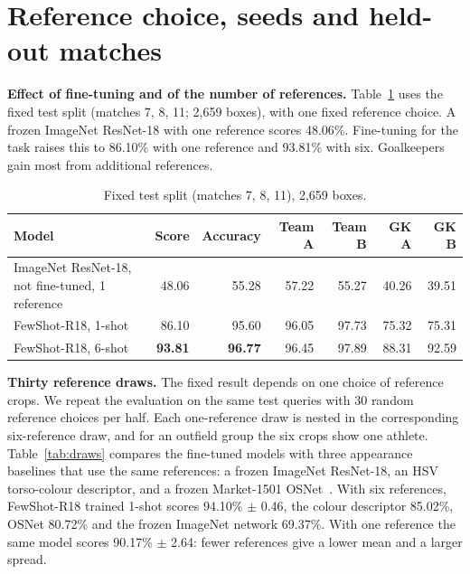\documentclass[10pt]{article}
\begin{document}
\section{Reference choice, seeds and held-out matches}
\label{sec:variance}

\textbf{Effect of fine-tuning and of the number of references.} Table~\ref{tab:fixed} uses the fixed test split (matches 7, 8, 11; 2,659 boxes), with one fixed reference choice. A frozen ImageNet ResNet-18 with one reference scores 48.06\%. Fine-tuning for the task raises this to 86.10\% with one reference and 93.81\% with six. Goalkeepers gain most from additional references.

\begin{table}[tbp]
\centering
\caption{Fixed test split (matches 7, 8, 11), 2,659 boxes.}
\label{tab:fixed}
\small
\begin{tabular}{lrrrrrr}
\toprule
Model & Score & Accuracy & Team A & Team B & GK A & GK B \\
\midrule
ImageNet ResNet-18, not fine-tuned, 1 reference & 48.06 & 55.28 & 57.22 & 55.27 & 40.26 & 39.51 \\
FewShot-R18, 1-shot & 86.10 & 95.60 & 96.05 & 97.73 & 75.32 & 75.31 \\
FewShot-R18, 6-shot & \textbf{93.81} & \textbf{96.77} & 96.45 & 97.89 & 88.31 & 92.59 \\
\bottomrule
\end{tabular}
\end{table}

\textbf{Thirty reference draws.} The fixed result depends on one choice of reference crops. We repeat the evaluation on the same test queries with 30 random reference choices per half. Each one-reference draw is nested in the corresponding six-reference draw, and for an outfield group the six crops show one athlete. Table~\ref{tab:draws} compares the fine-tuned models with three appearance baselines that use the same references: a frozen ImageNet ResNet-18, an HSV torso-colour descriptor, and a frozen Market-1501 OSNet~\cite{zhou2019osnet}. With six references, FewShot-R18 trained 1-shot scores 94.10\% $\pm$ 0.46, the colour descriptor 85.02\%, OSNet 80.72\% and the frozen ImageNet network 69.37\%. With one reference the same model scores 90.17\% $\pm$ 2.64: fewer references give a lower mean and a larger spread.
\end{document}
